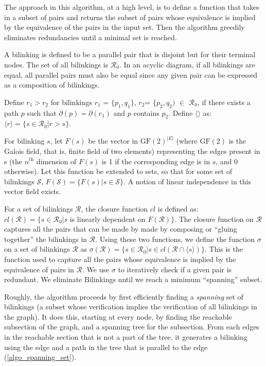 \documentclass[sigplan]{acmart}
\begin{document}
The approach in this algorithm, at a high level, is to define a function that takes in a subset of pairs and returns the subset of pairs whose equivalence is implied by the equivalence of the pairs in the input set.
Then the algorithm greedily eliminates redundancies until a minimal set is reached.

A bilinking is defined to be a parallel pair that is disjoint but for their terminal nodes. The set of all bilinkings is $\mathcal{R}_0$.
In an acyclic diagram, if all bilinkings are equal, all parallel pairs must also be equal since any given pair can be expressed as a composition of bilinkings.

Define $r_1>r_2$ for bilinkings $r_1$ = $\{p_1,q_1\}$, $r_2$= $\{p_2, q_2)$ $\in$ $\mathcal{R}_0$, if there exists a path $p$ such that $\partial(p) = \partial(r_1)$ and $p$ contains $p_2$.
Define $\langle\rangle$ as:
$\langle r \rangle = \{ s\in \mathcal{R}_0| r>s\}$.

For bilinking $s$, let $F(s)$ be the vector in $\text{GF}(2)^{|E|}$ (where $\text{GF}(2)$ is the Galois field, that is, finite field of two elements) representing the edges present in s (the $n^{\text{th}}$ dimension of $F(s)$ is 1 if the corresponding edge is in $s$, and 0 otherwise).
Let this function be extended to sets, so that for some set of bilinkings $\mathcal{S}$, $F(\mathcal{S}) = \{ F(s) | s\in \mathcal{S} \}$. A notion of linear independence in this vector field exists.

For a set of bilinkings $\mathcal{R}$, the closure function $cl$ is defined as:
$cl(\mathcal{R}) = \{ s\in \mathcal{R}_0| s$ is linearly dependent on $F(\mathcal{R}) \}$.
%
The closure function on $\mathcal{R}$ captures all the pairs that can be made by made by composing or ``gluing together'' the bilinkings in $\mathcal{R}$. 
%
Using these two functions, we define the function $\sigma$ on a set of bilinkings $\mathcal{R}$ as
$\sigma(\mathcal{R}) = \{s \in \mathcal{R}_0 | s\in cl(\mathcal{R}\cap \langle s \rangle) \}$.
This is the function used to capture all the pairs whose equivalence is implied by the equivalence of pairs in $\mathcal{R}$.
%
We use $\sigma$ to iteratively check if a given pair is redundant.
We eliminate Bilinkings until we reach a minimum ``spanning'' subset.

Roughly, the algorithm proceeds by first efficiently finding a \textit{spanning} set of bilinkings (a subset whose verification implies the verification of all bilinkings in the graph).
It does this, starting at every node, by finding the reachable subsection of the graph, and a spanning tree for the subsection.
From each edges in the reachable section that is not a part of the tree, it generates a bilinking using the edge and a path in the tree that is parallel to the edge (\ref{algo_spanning_set}).
\end{document}
